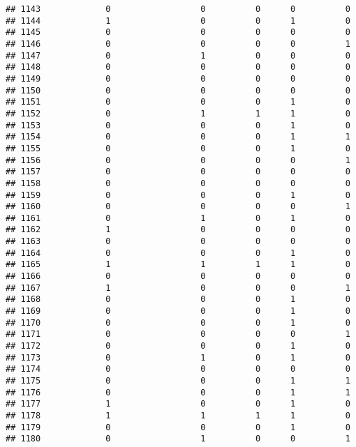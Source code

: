 \documentclass[
]{article}
\begin{document}
\begin{verbatim}
## 1143             0                  0          0      0          0
## 1144             1                  0          0      1          0
## 1145             0                  0          0      0          0
## 1146             0                  0          0      0          1
## 1147             0                  1          0      0          0
## 1148             0                  0          0      0          0
## 1149             0                  0          0      0          0
## 1150             0                  0          0      0          0
## 1151             0                  0          0      1          0
## 1152             0                  1          1      1          0
## 1153             0                  0          0      1          0
## 1154             0                  0          0      1          1
## 1155             0                  0          0      1          0
## 1156             0                  0          0      0          1
## 1157             0                  0          0      0          0
## 1158             0                  0          0      0          0
## 1159             0                  0          0      1          0
## 1160             0                  0          0      0          1
## 1161             0                  1          0      1          0
## 1162             1                  0          0      0          0
## 1163             0                  0          0      0          0
## 1164             0                  0          0      1          0
## 1165             1                  1          1      1          0
## 1166             0                  0          0      0          0
## 1167             1                  0          0      0          1
## 1168             0                  0          0      1          0
## 1169             0                  0          0      1          0
## 1170             0                  0          0      1          0
## 1171             0                  0          0      0          1
## 1172             0                  0          0      1          0
## 1173             0                  1          0      1          0
## 1174             0                  0          0      0          0
## 1175             0                  0          0      1          1
## 1176             0                  0          0      1          1
## 1177             1                  0          0      1          0
## 1178             1                  1          1      1          0
## 1179             0                  0          0      1          0
## 1180             0                  1          0      0          1

\end{verbatim}
\end{document}
